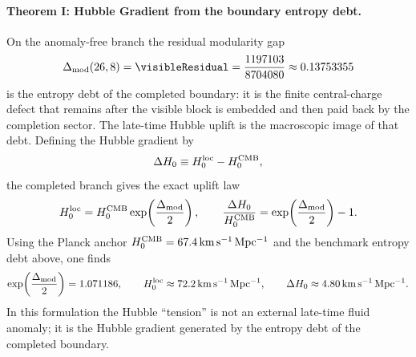 \documentclass[11pt]{article}
\begin{document}
\paragraph{Theorem I: Hubble Gradient from the boundary entropy debt.}
On the anomaly-free branch the residual modularity gap
\begin{equation}
 \Delta_{\rm mod}(26,8)=\visibleResidual
 = \frac{1197103}{8704080}
 \approx 0.13753355
\end{equation}
is the entropy debt of the completed boundary: it is the finite central-charge
defect that remains after the visible block is embedded and then paid back by
the completion sector. The late-time Hubble uplift is the macroscopic image of
that debt. Defining the Hubble gradient by
\begin{equation}
 \Delta H_0
 \equiv
 H_0^{\rm loc}-H_0^{\rm CMB},
\end{equation}
the completed branch gives the exact uplift law
\begin{equation}
 H_0^{\rm loc}
 =
 H_0^{\rm CMB}\exp\!\left(\frac{\Delta_{\rm mod}}{2}\right),
 \qquad
 \frac{\Delta H_0}{H_0^{\rm CMB}}
 =
 \exp\!\left(\frac{\Delta_{\rm mod}}{2}\right)-1.
\end{equation}
Using the Planck anchor $H_0^{\rm CMB}=67.4\,\mathrm{km\,s^{-1}\,Mpc^{-1}}$
and the benchmark entropy debt above, one finds
\begin{equation}
 \exp\!\left(\frac{\Delta_{\rm mod}}{2}\right)=1.071186,
 \qquad
 H_0^{\rm loc}\approx 72.2\,\mathrm{km\,s^{-1}\,Mpc^{-1}},
 \qquad
 \Delta H_0\approx 4.80\,\mathrm{km\,s^{-1}\,Mpc^{-1}}.
\end{equation}
In this formulation the Hubble ``tension'' is not an external late-time fluid
anomaly; it is the Hubble gradient generated by the entropy debt of the
completed boundary.
\end{document}
